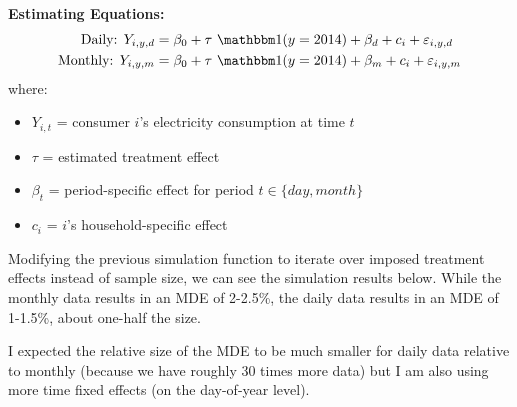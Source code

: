 \documentclass[12pt]{article}
\begin{document}
\textbf{Estimating Equations:}
\begin{align*}
\text{Daily: } Y_{i,y,d} &= \beta_0 + \tau\ \one(y=2014) 
    + \beta_d + c_i + \varepsilon_{i,y,d} \\
\text{Monthly: } Y_{i,y,m} &= \beta_0 + \tau\ \one(y=2014) 
    + \beta_m + c_i + \varepsilon_{i,y,m}
\end{align*}
where:
\begin{itemize}
    \item $Y_{i,t}$ = consumer $i$'s electricity consumption at time $t$
    \item $\tau$ = estimated treatment effect
    \item $\beta_t$ = period-specific effect for period $t\in\{day, month\}$
    \item $c_i$ = $i$'s household-specific effect
\end{itemize}



\vem
{}

Modifying the previous simulation function to iterate over imposed treatment effects instead of sample size, we can see the simulation results below. While the monthly data results in an MDE of 2-2.5\%, the daily data results in an MDE of 1-1.5\%, about one-half the size. 

I expected the relative size of the MDE to be much smaller for daily data relative to monthly (because we have roughly 30 times more data) but I am also using more time fixed effects (on the day-of-year level). 
\end{document}
